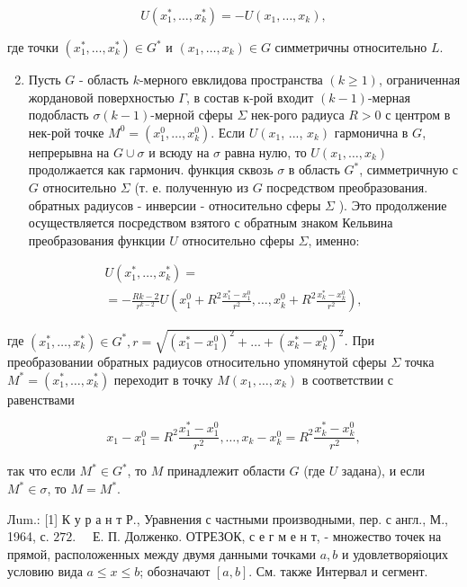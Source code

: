 \documentclass[10pt]{article}
\begin{document}
\[
U\left(x_{1}^{*}, \ldots, x_{k}^{*}\right)=-U\left(x_{1}, \ldots, x_{k}\right),
\]

где точки $\left(x_{1}^{*}, \ldots, x_{k}^{*}\right) \in G^{*}$ и $\left(x_{1}, \ldots, x_{k}\right) \in G$ симметричны относительно $L$.

\begin{enumerate}
  \setcounter{enumi}{1}
  \item Пусть $G$ - область $k$-мерного евклидова пространства $(k \geqslant 1)$, ограниченная жордановой поверхностью $\Gamma$, в состав к-рой входит $(k-1)$-мерная подобласть $\sigma(k-1)$-мерной сферы $\Sigma$ нек-рого радиуса $R>0$ с центром в нек-рой точке $M^{0}=\left(x_{1}^{0}, \ldots, x_{k}^{0}\right)$. Если $U\left(x_{1}\right.$, ..., $\left.x_{k}\right)$ гармонична в $G$, непрерывна на $G \cup \sigma$ и всюду на $\sigma$ равна нулю, то $U\left(x_{1}, \ldots, x_{k}\right)$ продолжается как гармонич. функция сквозь $\sigma$ в область $G^{*}$, симметричную с $G$ относительно $\Sigma$ (т. е. полученную из $G$ посредством преобразования. обратных радиусов - инверсии - относительно сферы $\Sigma$ ). Это продолжение осуществляется посредством взятого с обратным знаком Кельвина преобразования функции $U$ относительно сферы $\Sigma$, именно:
\end{enumerate}

\[
\begin{gathered}
U\left(x_{1}^{*}, \ldots, x_{k}^{*}\right)= \\
=-\frac{R k-2}{r^{k-2}} U\left(x_{1}^{0}+R^{2} \frac{x_{1}^{*}-x_{1}^{0}}{r^{2}}, \ldots, x_{k}^{0}+R^{2} \frac{x_{k}^{*}-x_{k}^{0}}{r^{2}}\right),
\end{gathered}
\]

где $\left(x_{1}^{*}, \ldots, x_{k}^{*}\right) \in G^{*}, r=\sqrt{\left(x_{1}^{*}-x_{1}^{0}\right)^{2}+\ldots+\left(x_{k}^{*}-x_{k}^{0}\right)^{2}}$. При преобразовании обратных радиусов относительно упомянутой сферы $\Sigma$ точка $M^{*}=\left(x_{1}^{*}, \ldots, x_{k}^{*}\right)$ переходит в точку $M\left(x_{1}, \ldots, x_{k}\right)$ в соответствии с равенствами

\[
x_{1}-x_{1}^{0}=R^{2} \frac{x_{1}^{*}-x_{1}^{0}}{r^{2}}, \ldots, x_{k}-x_{k}^{0}=R^{2} \frac{x_{k}^{*}-x_{k}^{0}}{r^{2}},
\]

так что если $M^{*} \in G^{*}$, то $M$ принадлежит области $G$ (где $U$ задана), и если $M^{*} \in \sigma$, то $M=M^{*}$.

Лum.: [1] К у р а н т Р., Уравнения с частными производными, пер. с англ., М., 1964, с. $272 . \quad$ Е. П. Долженко. ОТРЕЗОК, с е г м е н т, - множество точек на прямой, расположенных между двумя данными точками $a, b$ и удовлетворяіоцих условию вида $a \leqslant x \leqslant b$; обозначают $[a, b]$. См. также Интервал и сегмент.
\end{document}
